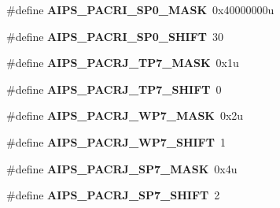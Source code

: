 \begin{DoxyCompactItemize}
\item 
\hypertarget{group___a_i_p_s___register___masks_ga8d3b3e823a7870628490a44e80329353}{}\#define {\bfseries A\+I\+P\+S\+\_\+\+P\+A\+C\+R\+I\+\_\+\+S\+P0\+\_\+\+M\+A\+S\+K}~0x40000000u\label{group___a_i_p_s___register___masks_ga8d3b3e823a7870628490a44e80329353}

\item 
\hypertarget{group___a_i_p_s___register___masks_gaa410004f31a6e724baf4d8cd425137ef}{}\#define {\bfseries A\+I\+P\+S\+\_\+\+P\+A\+C\+R\+I\+\_\+\+S\+P0\+\_\+\+S\+H\+I\+F\+T}~30\label{group___a_i_p_s___register___masks_gaa410004f31a6e724baf4d8cd425137ef}

\item 
\hypertarget{group___a_i_p_s___register___masks_ga1f6555984f62501575fd2f9d58ed8a39}{}\#define {\bfseries A\+I\+P\+S\+\_\+\+P\+A\+C\+R\+J\+\_\+\+T\+P7\+\_\+\+M\+A\+S\+K}~0x1u\label{group___a_i_p_s___register___masks_ga1f6555984f62501575fd2f9d58ed8a39}

\item 
\hypertarget{group___a_i_p_s___register___masks_ga1e66f58ebd5e384e2fea98ad200c3c4b}{}\#define {\bfseries A\+I\+P\+S\+\_\+\+P\+A\+C\+R\+J\+\_\+\+T\+P7\+\_\+\+S\+H\+I\+F\+T}~0\label{group___a_i_p_s___register___masks_ga1e66f58ebd5e384e2fea98ad200c3c4b}

\item 
\hypertarget{group___a_i_p_s___register___masks_ga2dcd14db8aa95d16eabb32f70232a6c8}{}\#define {\bfseries A\+I\+P\+S\+\_\+\+P\+A\+C\+R\+J\+\_\+\+W\+P7\+\_\+\+M\+A\+S\+K}~0x2u\label{group___a_i_p_s___register___masks_ga2dcd14db8aa95d16eabb32f70232a6c8}

\item 
\hypertarget{group___a_i_p_s___register___masks_ga6fadc0732bd0fcb36a2192481b2b8fe5}{}\#define {\bfseries A\+I\+P\+S\+\_\+\+P\+A\+C\+R\+J\+\_\+\+W\+P7\+\_\+\+S\+H\+I\+F\+T}~1\label{group___a_i_p_s___register___masks_ga6fadc0732bd0fcb36a2192481b2b8fe5}

\item 
\hypertarget{group___a_i_p_s___register___masks_ga30656d5b64b623e7e5f62079ed3e283a}{}\#define {\bfseries A\+I\+P\+S\+\_\+\+P\+A\+C\+R\+J\+\_\+\+S\+P7\+\_\+\+M\+A\+S\+K}~0x4u\label{group___a_i_p_s___register___masks_ga30656d5b64b623e7e5f62079ed3e283a}

\item 
\hypertarget{group___a_i_p_s___register___masks_gaf02780f9071222c73fe65b109f38b156}{}\#define {\bfseries A\+I\+P\+S\+\_\+\+P\+A\+C\+R\+J\+\_\+\+S\+P7\+\_\+\+S\+H\+I\+F\+T}~2\label{group___a_i_p_s___register___masks_gaf02780f9071222c73fe65b109f38b156}


\end{DoxyCompactItemize}
